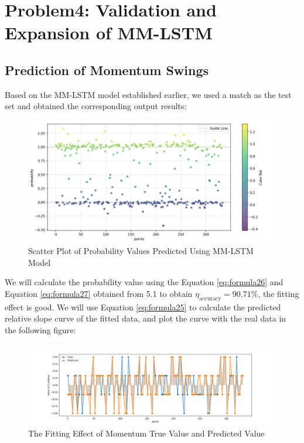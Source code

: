 \section{Problem4: Validation and Expansion of MM-LSTM }

\subsection{Prediction of Momentum Swings}

Based on the MM-LSTM model established earlier, we used a match as the test set and obtained the corresponding output results:

\begin{figure}[htbp]
    \centering
\includegraphics[width=1\textwidth]{figure/prediction_value_distribution.png}
    \caption{Scatter Plot of Probability Values Predicted Using MM-LSTM Model}
\end{figure}

We will calculate the probability value using the Equation \ref{eq:formula26}  and Equation \ref{eq:formula27} obtained from 5.1 to obtain $\eta_{\text{accuracy}} = 90.71\%$, the fitting effect is good. We will use Equation \ref{eq:formula25} to calculate the predicted relative slope curve of the fitted data, and plot the curve with the real data in the following figure:



\begin{figure}[htbp]
    \centering
     \hspace*{-1.2cm} %
    \includegraphics[width=1.1\textwidth]{figure/Figure_1.png}
    \caption{The Fitting Effect of Momentum True Value and Predicted Value}
\end{figure}

